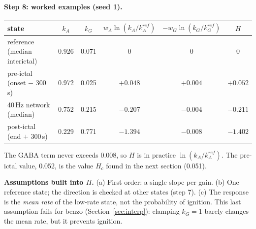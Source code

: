 \documentclass[11pt]{article}
\newcommand{\kA}{k_A}
\newcommand{\kG}{k_G}
\begin{document}
\paragraph{Step 8: worked examples (seed 1).}
\begin{center}\small
\begin{tabular}{lccccc}
\toprule
state & $\kA$ & $\kG$ & $w_A\ln(\kA/\kA^{ref})$ & $-w_G\ln(\kG/\kG^{ref})$ & $H$\\
\midrule
reference (median interictal) & 0.926 & 0.071 & 0 & 0 & 0\\
pre-ictal (onset $-$ 300\,s) & 0.972 & 0.025 & $+0.048$ & $+0.004$ & $+0.052$\\
40\,Hz network (median) & 0.752 & 0.215 & $-0.207$ & $-0.004$ & $-0.211$\\
post-ictal (end $+$ 300\,s) & 0.229 & 0.771 & $-1.394$ & $-0.008$ & $-1.402$\\
\bottomrule
\end{tabular}
\end{center}
The GABA term never exceeds 0.008, so $H$ is in practice $\ln(\kA/\kA^{ref})$. The pre-ictal value, 0.052, is the value
$H_c$ found in the next section (0.051).

\textbf{Assumptions built into $H$.}
(a) First order: a single slope per gain. (b) One reference state; the direction is checked at other states (step 7).
(c) The response is the \emph{mean rate} of the low-rate state, not the probability of ignition. This last assumption
fails for benzo (Section~\ref{sec:interp}): clamping $\kG=1$ barely changes the mean rate, but it prevents ignition.
\end{document}
